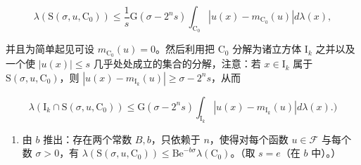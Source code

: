 \[
\lambda \left(\mathrm{S} (\sigma , u, \mathrm{C} _ {0})\right) \leqslant \frac {1}{s} \mathrm{G} (\sigma - 2 ^ {n} s) \int_ {\mathrm{C} _ {0}} | u (x) - m _ {\mathrm{C} _ {0}} (u) | d \lambda (x),
\]

并且为简单起见可设 \(m_{\mathrm{C}_0}(u) = 0\)。然后利用把 \(\mathrm{C}_0\) 分解为诸立方体 \(\mathrm{I}_k\) 之并以及一个使 \(|u(x)| \leqslant s\) 几乎处处成立的集合的分解，注意：若 \(x \in \mathrm{I}_k\) 属于 \(\mathrm{S}(\sigma, u, \mathrm{C}_0)\)，则 \(|u(x) - m_{\mathrm{I}_k}(u)| \geqslant \sigma - 2^n s\)，从而

\[
\lambda \left(\mathrm{I} _ {k} \cap \mathrm{S} (\sigma , u, \mathrm{C} _ {0})\right) \leqslant \mathrm{G} (\sigma - 2 ^ {n} s) \int_ {\mathrm{I} _ {k}} | u (x) - m _ {\mathrm{I} _ {k}} (u) | d \lambda (x). \Big)
\]

\begin{enumerate}
\def\labelenumi{\alph{enumi})}
\setcounter{enumi}{2}
\tightlist
\item
  由 \(b\) 推出：存在两个常数 \(B, b\)，只依赖于 \(n\)，使得对每个函数 \(u \in \mathcal{F}\) 与每个数 \(\sigma > 0\)，有 \(\lambda(\mathrm{S}(\sigma, u, \mathrm{C}_0)) \leqslant \mathrm{Be}^{-b\sigma}\lambda(\mathrm{C}_0)\)。（取 \(s = e\)（在 \(b\) 中）。）
\end{enumerate}

